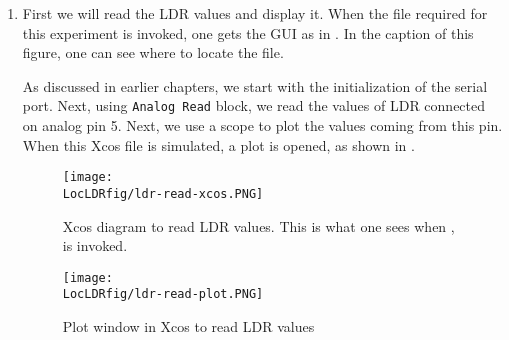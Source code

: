 \begin{enumerate}
  \item First we will read the LDR values and display it.  When the
        file required for this experiment is invoked, one gets the GUI as in
        .  In the caption of this figure, one
        can see where to locate the file. 
        
        As discussed in earlier chapters, we start with the initialization
        of the serial port. Next, using {\tt Analog Read} block, we read
        the values of LDR connected on analog pin 5. Next, we use a scope to plot the values 
        coming from this pin. When this Xcos file is simulated, a plot is opened, 
        as shown in . 
        
        \begin{figure}
          \centering
          \texttt{[image: \\LocLDRfig/ldr-read-xcos.PNG]}
          \caption[Xcos diagram to read LDR values]{Xcos diagram to read LDR
            values.  
            This is what one sees when 
            , is invoked.}
          \label{fig:ldr-read}
        \end{figure}
        
        \begin{figure}
          \centering
          \texttt{[image: \\LocLDRfig/ldr-read-plot.PNG]}
          \caption{Plot window in Xcos to read LDR values}
          \label{fig:ldr-read-plot}
        \end{figure}
        

\end{enumerate}
